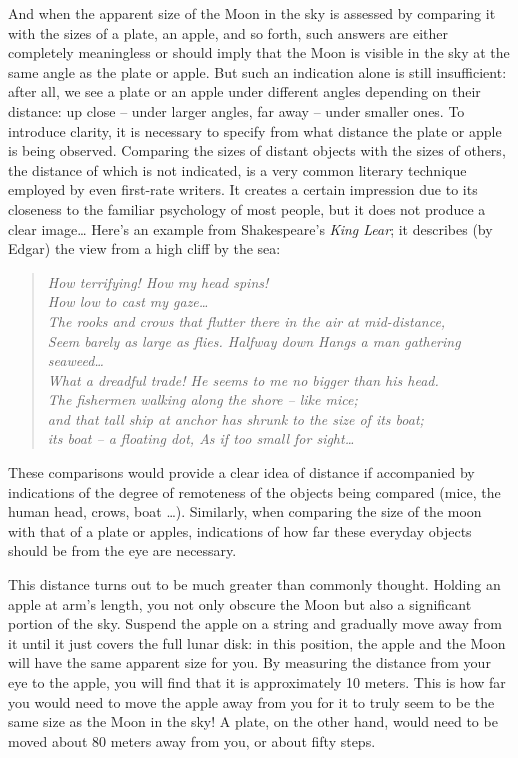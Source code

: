 And when the apparent size of the Moon in the sky is assessed by comparing it with the sizes of a plate, an apple, and so forth, such answers are either completely meaningless or should imply that the Moon is visible in the sky at the same angle as the plate or apple. But such an indication alone is still insufficient: after all, we see a plate or an apple under different angles depending on their distance: up close -- under larger angles, far away -- under smaller ones. To introduce clarity, it is necessary to specify from what distance the plate or apple is being observed. Comparing the sizes of distant objects with the sizes of others, the distance of which is not indicated, is a very common literary technique employed by even first-rate writers. It creates a certain impression due to its closeness to the familiar psychology of most people, but it does not produce a clear image\ldots{} Here's an example from Shakespeare's \emph{King Lear}; it describes (by Edgar) the view from a high cliff by the sea:
\begin{quote}
\emph{How terrifying! How my head spins!\\
How low to cast my gaze\ldots{}\\
The rooks and crows that flutter there in the air at mid-distance,\\ Seem barely as large as flies. Halfway down Hangs a man gathering seaweed\dots{} \\
What a dreadful trade! He seems to me no bigger than his head.\\
The fishermen walking along the shore -- like mice;\\
and that tall ship at anchor has shrunk to the size of its boat;\\ its boat -- a floating dot, As if too small for sight\dots{}}
\end{quote}
These comparisons would provide a clear idea of distance if accompanied by indications of the degree of remoteness of the objects being compared (mice, the human head, crows, boat \dots{}). Similarly, when comparing the size of the moon with that of a plate or apples, indications of how far these everyday objects should be from the eye are necessary.

This distance turns out to be much greater than commonly thought. Holding an apple at arm's length, you not only obscure the Moon but also a significant portion of the sky. Suspend the apple on a string and gradually move away from it until it just covers the full lunar disk: in this position, the apple and the Moon will have the same apparent size for you. By measuring the distance from your eye to the apple, you will find that it is approximately 10 meters. This is how far you would need to move the apple away from you for it to truly seem to be the same size as the Moon in the sky! A plate, on the other hand, would need to be moved about 80 meters away from you, or about fifty steps.

